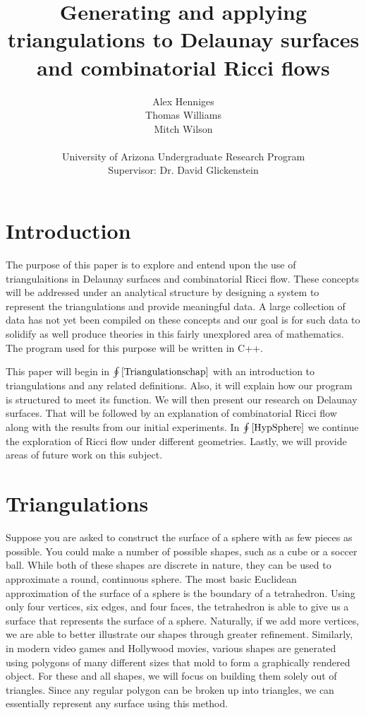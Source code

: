 \documentclass[12pt]{article}
\title{Generating and applying triangulations to Delaunay surfaces and combinatorial Ricci flows}
\author{Alex Henniges \\ Thomas Williams \\ Mitch Wilson \\ \\ University of Arizona Undergraduate Research Program\\
Supervisor: Dr. David Glickenstein\\
}
\begin{document}
\maketitle
\thispagestyle{empty}
\newpage
\renewcommand\contentsname{Table of Contents}
\tableofcontents

\newpage
\section{Introduction}

The purpose of this paper is to explore and entend upon the use of triangulaitions in Delaunay surfaces and combinatorial Ricci flow. These concepts will be addressed under an analytical structure by designing a system to represent the triangulations and provide meaningful data. A large collection of data has not yet been compiled on these concepts and our goal is for such data to solidify as well produce theories in this fairly unexplored area of mathematics. The program used for this purpose will be written in C++.\newline

\noindent This paper will begin in $\oint\ref{Triangulationschap}$ with an introduction to triangulations and any related definitions. Also, it will explain how our program is structured to meet its function. We will then present our research on Delaunay surfaces. That will be followed by an explanation of combinatorial Ricci flow along with the results from our initial experiments. In $\oint\ref{HypSphere}$ we continue the exploration of Ricci flow under different geometries. Lastly, we will provide areas of future work on this subject.

\section{Triangulations}
\label{Triangulationschap}

Suppose you are asked to construct the surface of a sphere with as few pieces as possible. You could make a number of possible shapes, such as a cube or a soccer ball. While both of these shapes are discrete in nature, they can be used to approximate a round, continuous sphere. The most basic Euclidean approximation of the surface of a sphere is the boundary of a tetrahedron. Using only four vertices, six edges, and four faces, the tetrahedron is able to give us a surface that represents the surface of a sphere. Naturally, if we add more vertices, we are able to better illustrate our shapes through greater refinement. Similarly, in modern video games and Hollywood movies, various shapes are generated using polygons of many different sizes that mold to form a graphically rendered object. For these and all shapes, we will focus on building them solely out of triangles. Since any regular polygon can be broken up into triangles, we can essentially represent any surface using this method. \newline
\end{document}

